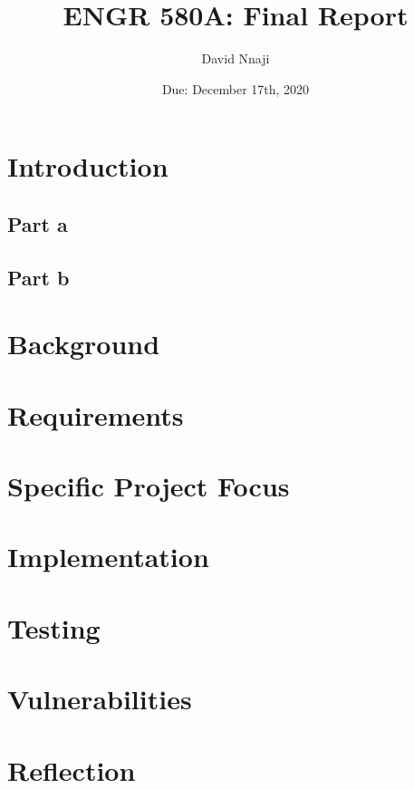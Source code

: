 
\title{ENGR 580A: Final Report}
\author{David Nnaji}
\date{Due: December 17th, 2020}


\maketitle

\section*{Introduction}
	\subsection*{Part a}
	\subsection*{Part b}
\section{Background}
\section{Requirements}
\section{Specific Project Focus}
\section{Implementation}
\section{Testing}
\section{Vulnerabilities}
\section{Reflection}
